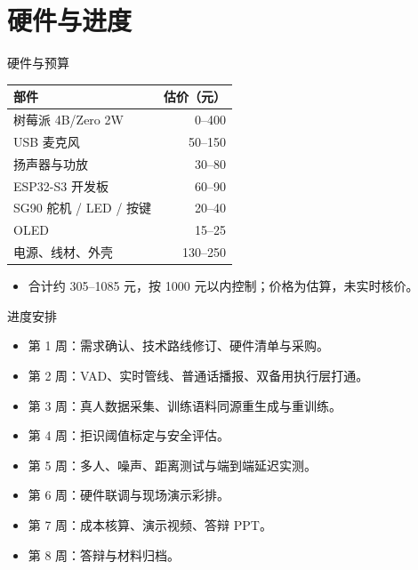 \documentclass[10pt]{beamer}
\begin{document}
\section{硬件与进度}
\begin{frame}{硬件与预算}
    \begin{table}
        \centering
        \begin{tabular}{lr}
            \toprule
            部件 & 估价（元） \\
            \midrule
            树莓派 4B/Zero 2W & 0--400 \\
            USB 麦克风 & 50--150 \\
            扬声器与功放 & 30--80 \\
            ESP32-S3 开发板 & 60--90 \\
            SG90 舵机 / LED / 按键 & 20--40 \\
            OLED & 15--25 \\
            电源、线材、外壳 & 130--250 \\
            \bottomrule
        \end{tabular}
    \end{table}
    \begin{itemize}
        \item 合计约 305--1085 元，按 1000 元以内控制；价格为估算，未实时核价。
    \end{itemize}
\end{frame}
\begin{frame}{进度安排}
    \begin{itemize}
        \item 第 1 周：需求确认、技术路线修订、硬件清单与采购。
        \item 第 2 周：VAD、实时管线、普通话播报、双备用执行层打通。
        \item 第 3 周：真人数据采集、训练语料同源重生成与重训练。
        \item 第 4 周：拒识阈值标定与安全评估。
        \item 第 5 周：多人、噪声、距离测试与端到端延迟实测。
        \item 第 6 周：硬件联调与现场演示彩排。
        \item 第 7 周：成本核算、演示视频、答辩 PPT。
        \item 第 8 周：答辩与材料归档。
    \end{itemize}
\end{frame}
\end{document}
